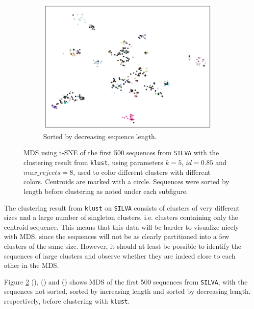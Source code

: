\clearpage
\begin{figure}[H]
  \ContinuedFloat
  \begin{subfigure}[b]{1.0\textwidth}
    \includegraphics[width=1.0\textwidth]{graphics/SILVA_t-SNE_decr_sort_500.png}
    \caption{Sorted by decreasing sequence length.}
    \label{fig:mds_silva_sort_decr}
  \end{subfigure}
  \caption{MDS using t-SNE of the first 500 sequences from \texttt{SILVA} with
    the clustering result from \texttt{klust}, using parameters $k=5$,
    $id=0.85$ and $max\_rejects=8$, used to color different clusters with
    different colors. Centroids are marked with a circle. Sequences were sorted
    by length before clustering as noted under each subfigure.}
  \label{fig:mds_silva}
\end{figure}

The clustering result from \texttt{klust} on \texttt{SILVA} consists of
clusters of very different sizes and a large number of singleton clusters, i.e.
clusters containing only the centroid sequence. This means that this data will
be harder to visualize nicely with MDS, since the sequences will not be as
clearly partitioned into a few clusters of the same size. However, it should at
least be possible to identify the sequences of large clusters and observe
whether they are indeed close to each other in the MDS.

Figure \ref{fig:mds_silva} (),
() and () shows
MDS of the first 500 sequences from \texttt{SILVA}, with the sequences not
sorted, sorted by increasing length and sorted by decreasing length,
respectively, before clustering with \texttt{klust}.

